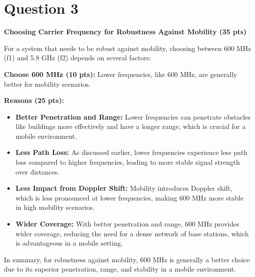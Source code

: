 \documentclass[12pt]{article}
\begin{document}
\section*{Question 3}
\textbf{Choosing Carrier Frequency for Robustness Against Mobility (35 pts)}

For a system that needs to be robust against mobility, choosing between 600 MHz (f1) and 5.8 GHz (f2) depends on several factors:

\textbf{Choose 600 MHz (10 pts):} Lower frequencies, like 600 MHz, are generally better for mobility scenarios.

\textbf{Reasons (25 pts):}
\begin{itemize}
    \item \textbf{Better Penetration and Range:} Lower frequencies can penetrate obstacles like buildings more effectively and have a longer range, which is crucial for a mobile environment.
    \item \textbf{Less Path Loss:} As discussed earlier, lower frequencies experience less path loss compared to higher frequencies, leading to more stable signal strength over distances.
    \item \textbf{Less Impact from Doppler Shift:} Mobility introduces Doppler shift, which is less pronounced at lower frequencies, making 600 MHz more stable in high mobility scenarios.
    \item \textbf{Wider Coverage:} With better penetration and range, 600 MHz provides wider coverage, reducing the need for a dense network of base stations, which is advantageous in a mobile setting.
\end{itemize}

In summary, for robustness against mobility, 600 MHz is generally a better choice due to its superior penetration, range, and stability in a mobile environment.
\end{document}
